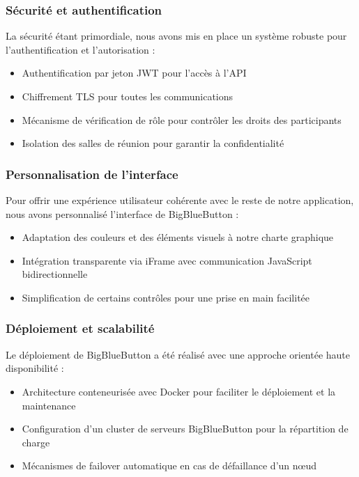 \subsubsection{Sécurité et authentification}
La sécurité étant primordiale, nous avons mis en place un système robuste pour l'authentification et l'autorisation :

\begin{itemize}
    \item Authentification par jeton JWT pour l'accès à l'API
    \item Chiffrement TLS pour toutes les communications
    \item Mécanisme de vérification de rôle pour contrôler les droits des participants
    \item Isolation des salles de réunion pour garantir la confidentialité
\end{itemize}

\subsubsection{Personnalisation de l'interface}
Pour offrir une expérience utilisateur cohérente avec le reste de notre application, nous avons personnalisé l'interface de BigBlueButton :

\begin{itemize}
    \item Adaptation des couleurs et des éléments visuels à notre charte graphique
    \item Intégration transparente via iFrame avec communication JavaScript bidirectionnelle
    \item Simplification de certains contrôles pour une prise en main facilitée
   
\end{itemize}

\subsubsection{Déploiement et scalabilité}
Le déploiement de BigBlueButton a été réalisé avec une approche orientée haute disponibilité :

\begin{itemize}
    \item Architecture conteneurisée avec Docker pour faciliter le déploiement et la maintenance
    \item Configuration d'un cluster de serveurs BigBlueButton pour la répartition de charge
    \item Mécanismes de failover automatique en cas de défaillance d'un nœud
\end{itemize}


